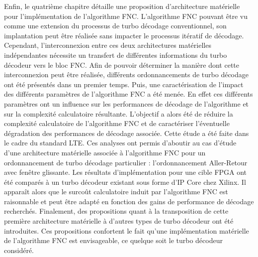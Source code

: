 Enfin, le quatrième chapitre détaille une proposition d'architecture matérielle pour l'implémentation de l'algorithme
FNC. L'algorithme FNC pouvant être vu comme une extension du processus de turbo décodage conventionnel, son implantation
peut être réalisée sans impacter le processus itératif de décodage. Cependant, l'interconnexion entre ces deux architectures 
matérielles indépendantes nécessite un transfert de différentes informations du turbo décodeur vers le bloc FNC. Afin
de pouvoir déterminer la manière dont cette interconnexion peut être réalisée, différents ordonnancements de turbo décodage 
ont été présentés dans un premier temps. Puis, une caractérisation de l'impact des différents paramètres de 
l'algorithme FNC a été menée. En effet ces différents paramètres ont un influence sur les performances de décodage de 
l'algorithme et sur la complexité calculatoire résultante. L'objectif a alors été de réduire la complexité calculatoire de 
l'algorithme FNC et de caractériser l'éventuelle dégradation des performances de décodage associée. Cette étude
a été faite dans le cadre du standard LTE. Ces analyses ont permis d'aboutir au cas d'étude d'une architecture 
matérielle associée à l'algorithme FNC pour un ordonnancement de turbo décodage particulier : l'ordonnancement Aller-Retour
avec fenêtre glissante. Les résultats d'implémentation
pour une cible FPGA ont été comparés à un turbo décodeur existant sous forme d'IP Core chez Xilinx. Il apparaît alors que le
surcoût calculatoire induit par l'algorithme FNC est raisonnable et peut être adapté en fonction des gains de
performance de décodage recherchés. Finalement, des propositions quant à la transposition de cette première architecture
matérielle à d'autres types de turbo décodeur ont été introduites. Ces propositions confortent le fait qu'une implémentation matérielle 
de l'algorithme FNC est envisageable, ce quelque soit le turbo décodeur considéré.

